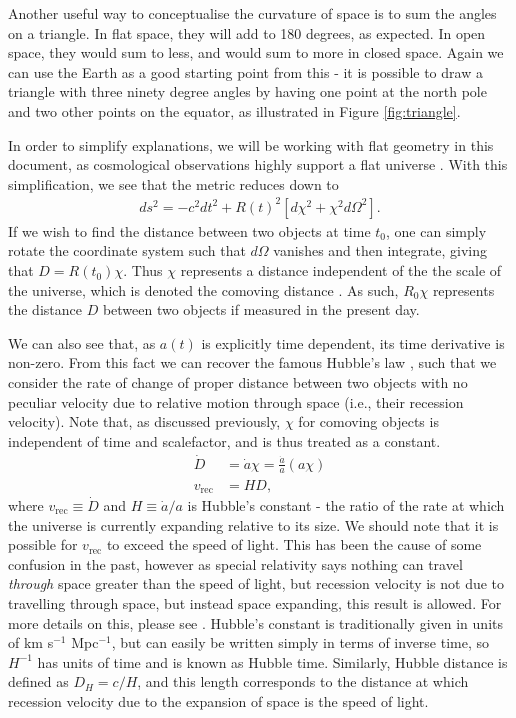 \documentclass[titlesmallcaps, examinerscopy, copyrightpage]{uqthesis}
\begin{document}
Another useful way to conceptualise the curvature of space is to sum the angles on a triangle. In flat space, they will add to 180 degrees, as expected. In open space, they would sum to less, and would sum to more in closed space. Again we can use the Earth as a good starting point from this - it is possible to draw a triangle with three ninety degree angles by having one point at the north pole and two other points on the equator, as illustrated in Figure \ref{fig:triangle}. 

In order to simplify explanations, we will be working with flat geometry in this document, as cosmological observations highly support a flat universe \citep{Planck201416, DavisMortsell2007,Mortonson2009}. With this simplification, we see that the metric reduces down to
\begin{align} \label{eq:flatmetric}
ds^2 = -c^2 dt^2 + R(t)^2 \left[ d\chi^2 + \chi^2 d\Omega^2 \right].
\end{align}
If we wish to find the distance between two objects at time $t_0$, one can simply rotate the coordinate system such that $d\Omega$ vanishes and then integrate, giving that $D = R(t_0) \chi$. Thus $\chi$ represents a distance independent of the the scale of the universe, which is denoted the comoving distance \citep{CarrollOstlie2006}.  As such, $R_0 \chi$ represents the distance $D$ between two objects if measured in the present day.

We can also see that, as $a(t)$ is explicitly time dependent, its time derivative is non-zero. From this fact we can recover the famous Hubble's law \citep{Hubble1929}, such that we consider the rate of change of proper distance between two objects with no peculiar velocity due to relative motion through space (i.e., their recession velocity). Note that, as discussed previously, $\chi$ for comoving objects is independent of time and scalefactor, and is thus treated as a constant.
\begin{align}
\dot{D} &= \dot{a} \chi  = \frac{\dot{a}}{a} (a \chi)\\
v_{\text{rec}} &= H D,
\end{align}
where $v_{\text{rec}} \equiv \dot{D}$ and $H \equiv \dot{a}/a$ is Hubble's constant - the ratio of the rate at which the universe is currently expanding relative to its size. We should note that it is possible for $v_{\text{rec}}$ to exceed the speed of light. This has been the cause of some confusion in the past, however as special relativity says nothing can travel \textit{through} space greater than the speed of light, but recession velocity is not due to travelling through space, but instead space expanding, this result is allowed. For more details on this, please see \citet{DavisLineweaver2004}. Hubble's constant is traditionally given in units of km s$^{-1}$ Mpc$^{-1}$, but can easily be written simply in terms of inverse time, so $H^{-1}$ has units of time and is known as Hubble time. Similarly, Hubble distance is defined as $D_H = c/H$, and this length corresponds to the distance at which recession velocity due to the expansion of space is the speed of light.
\end{document}
